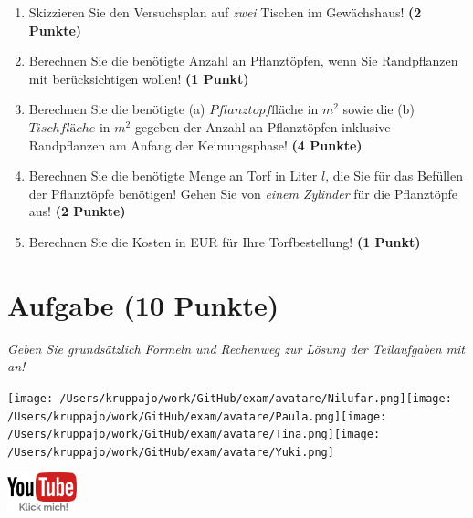\documentclass[a4paper, 9pt]{scrartcl}\usepackage[]{graphicx}\usepackage[]{xcolor}
\begin{document}
\begin{enumerate}
\item Skizzieren Sie den Versuchsplan auf \textit{zwei} Tischen im Gewächshaus! \textbf{(2 Punkte)}
\item Berechnen Sie die benötigte Anzahl an Pflanztöpfen, wenn Sie Randpflanzen mit berücksichtigen wollen! \textbf{(1 Punkt)}
\item Berechnen Sie die benötigte (a) $Pflanztopf$fläche in $m^2$ sowie die (b) $Tischfläche$ in $m^2$ gegeben der Anzahl an Pflanztöpfen inklusive Randpflanzen am Anfang der Keimungsphase! \textbf{(4 Punkte)}
\item Berechnen Sie die benötigte Menge an Torf in Liter $l$, die Sie für das Befüllen der Pflanztöpfe benötigen! Gehen Sie von \textit{einem Zylinder} für die Pflanztöpfe aus!  \textbf{(2 Punkte)}
\item Berechnen Sie die Kosten in EUR für Ihre Torfbestellung! \textbf{(1 Punkt)}
\end{enumerate}



 
\clearpage

\section{Aufgabe \hfill (10 Punkte)}

\textit{Geben Sie grundsätzlich Formeln und Rechenweg zur Lösung der Teilaufgaben mit an!} \\[1Ex]
 

 
\begin{minipage}[t]{0.5\textwidth}
\texttt{[image: /Users/kruppajo/work/GitHub/exam/avatare/Nilufar.png]}\hspace{-4mm}\texttt{[image: /Users/kruppajo/work/GitHub/exam/avatare/Paula.png]}\hspace{-4mm}\texttt{[image: /Users/kruppajo/work/GitHub/exam/avatare/Tina.png]}\hspace{-4mm}\texttt{[image: /Users/kruppajo/work/GitHub/exam/avatare/Yuki.png]}
\end{minipage}
\begin{minipage}[t]{0.5\textwidth}
\hfill
\href{https://youtu.be/aBxLkdF-c4M}{\includegraphics[width = 2cm]{img/youtube}}
\end{minipage}
\end{document}
